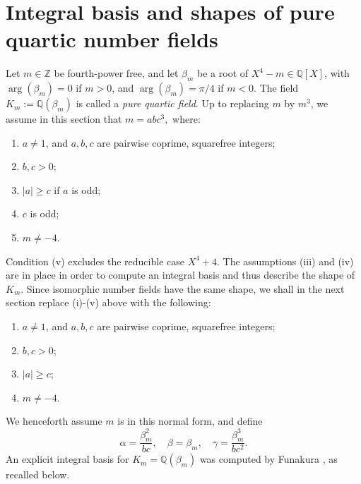 \documentclass[table]{amsart}
\newcommand{\Z}{\mathbb{Z}}
\newcommand{\Q}{\mathbb{Q}}
\numberwithin{equation}{section}
\begin{document}
\section{Integral basis and shapes of pure quartic number fields}\label{sec3}
\par Let $m \in \Z$ be fourth-power free, and let $\beta_m$ be a root of $X^4 - m \in \Q[X]$, with $\arg(\beta_m) = 0$ if $m > 0$, and $\arg(\beta_m) = \pi/4$ if $m < 0$. The field $K_m:=\Q(\beta_m)$ is called a \emph{pure quartic field}. Up to replacing $m$ by $m^3$, we assume in this section that $
m = abc^3,
$ where:
\begin{enumerate}
\item[(i)] $a \ne 1$, and $a, b, c$ are pairwise coprime, squarefree integers;
\item[(ii)] $b, c > 0$;
\item[(iii)] $|a| \ge c$ if $a$ is odd;
\item[(iv)] $c$ is odd;
\item[(v)] $m \ne -4$.
\end{enumerate}
\noindent Condition (v) excludes the reducible case $X^4 + 4$. The assumptions (iii) and (iv) are in place in order to compute an integral basis and thus describe the shape of $K_m$. Since isomorphic number fields have the same shape, we shall in the next section replace (i)-(v) above with the following:
\begin{enumerate}
\item[(i')] $a \ne 1$, and $a, b, c$ are pairwise coprime, squarefree integers;
\item[(ii')] $b, c > 0$;
\item[(iii')] $|a| \ge c$;
\item[(iv')] $m \ne -4$.
\end{enumerate}

We henceforth assume $m$ is in this normal form, and define
$$
\alpha = \frac{\beta_m^2}{bc}, \quad \beta = \beta_m, \quad \gamma = \frac{\beta_m^3}{bc^2}.
$$
\noindent An explicit integral basis for $K_m = \Q(\beta_m)$ was computed by Funakura \cite{Funakura}, as recalled below.
\end{document}
